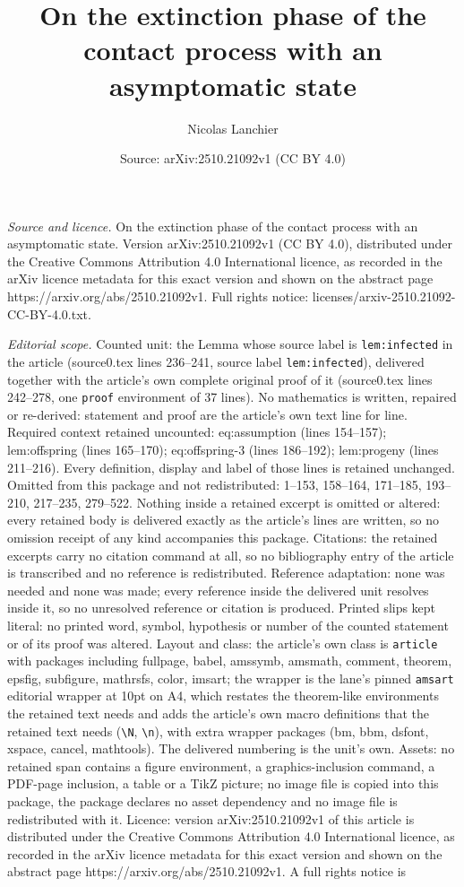\documentclass[10pt,a4paper]{amsart}
\title[On the extinction phase of the contact process with an asymp]{On the extinction phase of the contact process with an asymptomatic state}
\author{Nicolas Lanchier}
\date{Source: arXiv:2510.21092v1 (CC BY 4.0)}
\begin{document}
\maketitle

\noindent\emph{Source and licence.} On the extinction phase of the contact process with an asymptomatic state. Version arXiv:2510.21092v1 (CC BY 4.0), distributed under the Creative Commons Attribution 4.0 International licence, as recorded in the arXiv licence metadata for this exact version and shown on the abstract page https://arxiv.org/abs/2510.21092v1. Full rights notice: licenses/arxiv-2510.21092-CC-BY-4.0.txt.\par\smallskip

\noindent\textit{Editorial scope.} Counted unit: the Lemma whose source label is \texttt{lem:infected} in the article (source0.tex lines 236--241, source label \texttt{lem:infected}), delivered together with the article's own complete original proof of it (source0.tex lines 242--278, one \texttt{proof} environment of 37 lines). No mathematics is written, repaired or re-derived: statement and proof are the article's own text line for line. Required context retained uncounted: eq:assumption (lines 154--157); lem:offspring (lines 165--170); eq:offspring-3 (lines 186--192); lem:progeny (lines 211--216). Every definition, display and label of those lines is retained unchanged. Omitted from this package and not redistributed: 1--153, 158--164, 171--185, 193--210, 217--235, 279--522. Nothing inside a retained excerpt is omitted or altered: every retained body is delivered exactly as the article's lines are written, so no omission receipt of any kind accompanies this package. Citations: the retained excerpts carry no citation command at all, so no bibliography entry of the article is transcribed and no reference is redistributed. Reference adaptation: none was needed and none was made; every reference inside the delivered unit resolves inside it, so no unresolved reference or citation is produced. Printed slips kept literal: no printed word, symbol, hypothesis or number of the counted statement or of its proof was altered. Layout and class: the article's own class is \texttt{article} with packages including fullpage, babel, amssymb, amsmath, comment, theorem, epsfig, subfigure, mathrsfs, color, imsart; the wrapper is the lane's pinned \texttt{amsart} editorial wrapper at 10pt on A4, which restates the theorem-like environments the retained text needs and adds the article's own macro definitions that the retained text needs (\texttt{\textbackslash N}, \texttt{\textbackslash n}), with extra wrapper packages (bm, bbm, dsfont, xspace, cancel, mathtools). The delivered numbering is the unit's own. Assets: no retained span contains a figure environment, a graphics-inclusion command, a PDF-page inclusion, a table or a TikZ picture; no image file is copied into this package, the package declares no asset dependency and no image file is redistributed with it. Licence: version arXiv:2510.21092v1 of this article is distributed under the Creative Commons Attribution 4.0 International licence, as recorded in the arXiv licence metadata for this exact version and shown on the abstract page https://arxiv.org/abs/2510.21092v1. A full rights notice is 
\end{document}
